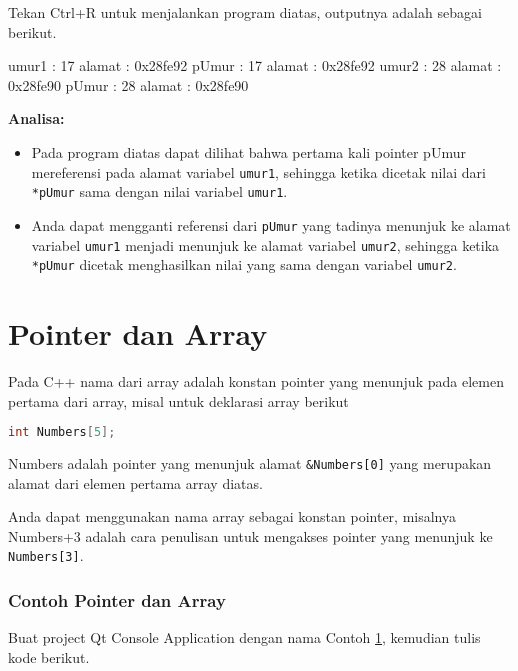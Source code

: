 Tekan Ctrl+R untuk menjalankan program diatas, outputnya adalah sebagai
berikut.

\begin{lcverbatim}
umur1 : 17 alamat : 0x28fe92
pUmur : 17 alamat : 0x28fe92
umur2 : 28 alamat : 0x28fe90
pUmur : 28 alamat : 0x28fe90
\end{lcverbatim}

\textbf{Analisa:}

\begin{itemize}
\tightlist
\item
  Pada program diatas dapat dilihat bahwa pertama kali pointer pUmur
  mereferensi pada alamat variabel \texttt{umur1}, sehingga ketika
  dicetak nilai dari \texttt{*pUmur} sama dengan nilai variabel
  \texttt{umur1}.
\item
  Anda dapat mengganti referensi dari \texttt{pUmur} yang tadinya
  menunjuk ke alamat variabel \texttt{umur1} menjadi menunjuk ke alamat
  variabel \texttt{umur2}, sehingga ketika \texttt{*pUmur} dicetak
  menghasilkan nilai yang sama dengan variabel \texttt{umur2}.
\end{itemize}

\section{Pointer dan Array}\label{pointer-dan-array}

Pada C++ nama dari array adalah konstan pointer yang menunjuk pada
elemen pertama dari array, misal untuk deklarasi array berikut

\begin{lstlisting}[language=c++, numbers=none]
int Numbers[5];
\end{lstlisting}

Numbers adalah pointer yang menunjuk alamat \texttt{\&Numbers{[}0{]}}
yang merupakan alamat dari elemen pertama array diatas.

Anda dapat menggunakan nama array sebagai konstan pointer, misalnya
Numbers+3 adalah cara penulisan untuk mengakses pointer yang menunjuk ke
\texttt{Numbers{[}3{]}}.

\subsubsection*{Contoh  Pointer dan Array}

Buat project Qt Console Application dengan nama Contoh \ref{pointer-dan-array}, kemudian tulis
kode berikut.

